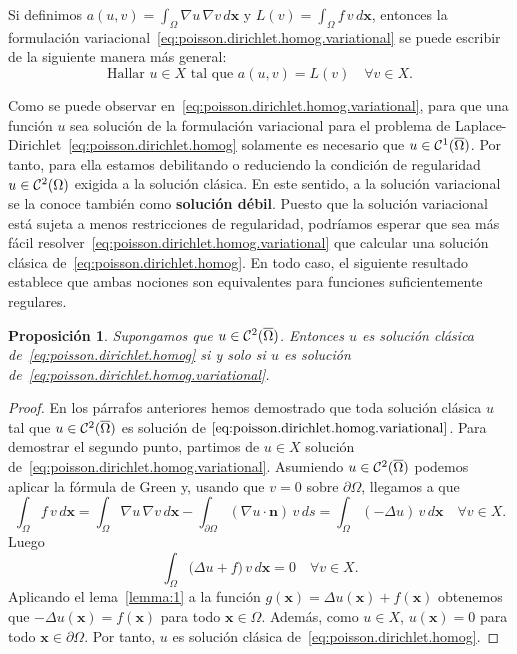 \documentclass[11pt]{report}
\theoremstyle{plain}
\newtheorem{proposition}[theorem]{Proposición}
\theoremstyle{definition}
\newcommand{\xx}{\ensuremath{\mathbf{x}}\xspace}
\newcommand{\uu}{\ensuremath{u}\xspace}
\newcommand{\vv}{\ensuremath{v}\xspace}
\newcommand{\nn}{\ensuremath{\mathbf{n}}\xspace}
\newcommand{\classC}[2]{%
  \ensuremath{
   \ifthenelse{\equal{#2}{}}
    {\mathcal{C}^{#1}}
    {\mathcal{C}^{#1}(#2)}
  }
}
\begin{document}
Si definimos $a(u,v) = \int_\Omega\nabla u \, \nabla v \, d\xx$ y $L(v) = \int_\Omega f\, v \, d\xx$, entonces la formulación variacional~\eqref{eq:poisson.dirichlet.homog.variational} se puede escribir de la siguiente manera más general:
\begin{displaymath}
  \text{Hallar } \uu \in X \text{ tal que } a(\uu,\vv) = L(\vv) \quad\forall\vv\in X. 
\end{displaymath}

Como se puede observar en~\eqref{eq:poisson.dirichlet.homog.variational}, para que una función $\uu$ sea solución de la formulación variacional para el problema de Laplace-Dirichlet~\eqref{eq:poisson.dirichlet.homog} solamente es necesario que $u\in\classC1{\overline\Omega}$. Por tanto, para ella estamos debilitando o reduciendo la condición de regularidad  $u\in\classC2\Omega$ exigida a la solución clásica. En este sentido, a la solución variacional se la conoce también como \textbf{solución débil}. Puesto que la solución variacional está sujeta a menos restricciones de regularidad, podríamos esperar que sea más fácil resolver~\eqref{eq:poisson.dirichlet.homog.variational} que calcular una solución clásica de~\eqref{eq:poisson.dirichlet.homog}. En todo caso, el siguiente resultado establece que ambas nociones son equivalentes para funciones suficientemente regulares.
\begin{proposition} Supongamos que $\uu\in\classC2{\overline\Omega}$. Entonces $\uu$ es solución clásica de~\eqref{eq:poisson.dirichlet.homog} si y solo si $\uu$ es solución de~\eqref{eq:poisson.dirichlet.homog.variational}. 
\end{proposition}
  
\begin{proof}

  En los párrafos anteriores hemos demostrado que toda solución clásica $\uu$ tal que $u\in\classC2{\overline\Omega}$ es solución de $\eqref{eq:poisson.dirichlet.homog.variational}$. Para demostrar el segundo punto, partimos de $\uu\in X$ solución de~\eqref{eq:poisson.dirichlet.homog.variational}.  Asumiendo $u\in\classC2{\overline\Omega}$ podemos aplicar la fórmula de Green y, usando que $\vv=0$ sobre $\partial\Omega$, llegamos a que
  \[
 \int_\Omega f\, \vv \, d\xx =
  \int_\Omega \nabla\uu\, \nabla\vv \, d\xx - 
  \int_{\partial\Omega} (\nabla\uu\cdot\nn)\,\vv \, ds = 
  \int_\Omega (-\Delta\uu)\,\vv \, d\xx \quad\forall\vv\in X.
  \]
  Luego 
  \[
    \int_\Omega \big(\Delta \uu + f\big)\, \vv \, d\xx = 0 \quad\forall\vv\in X.
  \]
  Aplicando el lema~\ref{lemma:1} a la función $g(\xx) = \Delta \uu(\xx) + f(\xx)$ obtenemos que $-\Delta\uu(\xx) = f(\xx)$ para todo $\xx\in\Omega$. Además, como $\uu\in X$, $\uu(\xx)=0$ para todo $\xx\in\partial\Omega$. Por tanto, $\uu$ es solución clásica de~\eqref{eq:poisson.dirichlet.homog}.
\end{proof}
\end{document}
